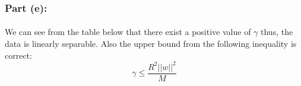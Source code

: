 \documentclass[11pt]{article}
\begin{document}
\begin{flushleft}
\subsubsection*{Part (e):}
\begin{figure}[H]
	\centering
\end{figure}

\paragraph{}

We can see from the table below that there exist a positive value of $\gamma$ thus, the data is linearly separable. Also the upper bound from the following inequality is correct: 
$$\gamma \le  \frac{R^2 ||w||^2}{M}$$



\end{flushleft}
\end{document}
